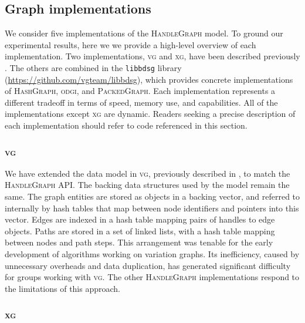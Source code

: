 \documentclass{article}
\begin{document}


\subsection{Graph implementations}

We consider five implementations of the \textsc{HandleGraph} model.
To ground our experimental results, here we we provide a high-level overview of each implementation.
Two implementations, \textsc{vg} and \textsc{xg}, have been described previously \cite{Garrison_2018,Garrison_2019}.
The others are combined in the \texttt{libbdsg} library (\url{https://github.com/vgteam/libbdsg}), which provides concrete implementations of \textsc{HashGraph}, \textsc{odgi}, and \textsc{PackedGraph}.
Each implementation represents a different tradeoff in terms of speed, memory use, and capabilities.
All of the implementations except \textsc{xg} are dynamic.
Readers seeking a precise description of each implementation should refer to code referenced in this section.

\subsubsection{\textsc{vg}}

We have extended the data model in \textsc{vg}, previously described in \cite{Garrison_2018}, to match the \textsc{HandleGraph} API.
The backing data structures used by the model remain the same.
The graph entities are stored as objects in a backing vector, and referred to internally by hash tables that map between node identifiers and pointers into this vector.
Edges are indexed in a hash table mapping pairs of handles to edge objects.
Paths are stored in a set of linked lists, with a hash table mapping between nodes and path steps.
This arrangement was tenable for the early development of algorithms working on variation graphs.
Its inefficiency, caused by unnecessary overheads and data duplication, has generated significant difficulty for groups working with \textsc{vg}.
The other \textsc{HandleGraph} implementations respond to the limitations of this approach.

\subsubsection{\textsc{xg}}
\end{document}
